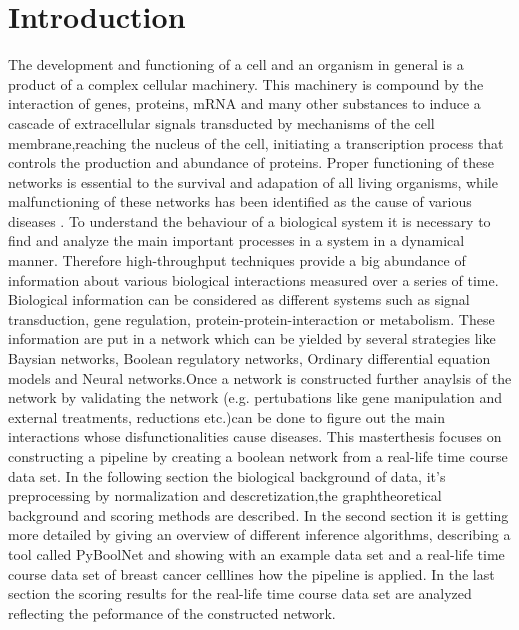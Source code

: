 \chapter{Introduction}

The development and functioning of a cell and an organism in general is a product of a complex cellular machinery. This machinery is compound by the interaction of genes, proteins, mRNA and many other substances to induce a cascade of extracellular signals transducted by mechanisms of the cell membrane,reaching the nucleus of the cell, initiating a transcription process that controls the production and abundance of proteins. Proper functioning of these networks is essential to the survival and adapation of all living organisms, while malfunctioning of these networks has been identified as the cause of various diseases \citep{An evaluation of methods for inferring boolean network from time-series data}.
To understand the behaviour of a biological system it is necessary to find and analyze the main important processes in a system in a dynamical manner. Therefore high-throughput techniques provide a big abundance of information about various biological interactions measured over a series of time. Biological information can be considered as different systems such as signal transduction, gene regulation, protein-protein-interaction or metabolism. These information are put in a network which can be yielded by several strategies like Baysian networks, Boolean regulatory networks, Ordinary differential equation models and Neural networks\citep{SAADATPOUR20133}.Once a network is constructed further anaylsis of the network by validating the network (e.g. pertubations like gene manipulation and external treatments, reductions etc.)can be done to figure out the main interactions whose disfunctionalities cause diseases.
This masterthesis focuses on constructing a pipeline by creating a boolean network from a real-life time course data set.
In the following section the biological background of data, it's preprocessing by normalization and descretization,the graphtheoretical background and scoring methods are described.
In the second section it is getting more detailed by giving an overview of different inference algorithms, describing a tool called PyBoolNet and showing with an example data set and a real-life time course data set of breast cancer celllines how the pipeline is applied.
In the last section the scoring results for the real-life time course data set are analyzed reflecting the peformance of the constructed network.



